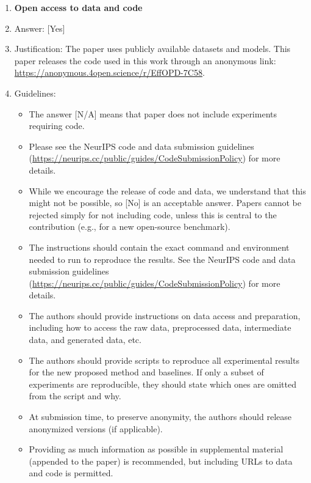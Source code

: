 \documentclass{llmxive}
\providecommand{\answerYes}[1][]{[Yes]#1}
\providecommand{\answerNo}[1][]{[No]#1}
\providecommand{\answerNA}[1][]{[N/A]#1}
\begin{document}
\begin{enumerate}
\item {\bf Open access to data and code}
    \item[] Answer: \answerYes{}
    \item[] Justification: The paper uses publicly available datasets and models. This paper releases the code used in this work through an anonymous link: \href{https://anonymous.4open.science/r/EffOPD-7C58/README.md}{https://anonymous.4open.science/r/EffOPD-7C58}.
    \item[] Guidelines:
    \begin{itemize}
        \item The answer \answerNA{} means that paper does not include experiments requiring code.
        \item Please see the NeurIPS code and data submission guidelines (\url{https://neurips.cc/public/guides/CodeSubmissionPolicy}) for more details.
        \item While we encourage the release of code and data, we understand that this might not be possible, so \answerNo{} is an acceptable answer. Papers cannot be rejected simply for not including code, unless this is central to the contribution (e.g., for a new open-source benchmark).
        \item The instructions should contain the exact command and environment needed to run to reproduce the results. See the NeurIPS code and data submission guidelines (\url{https://neurips.cc/public/guides/CodeSubmissionPolicy}) for more details.
        \item The authors should provide instructions on data access and preparation, including how to access the raw data, preprocessed data, intermediate data, and generated data, etc.
        \item The authors should provide scripts to reproduce all experimental results for the new proposed method and baselines. If only a subset of experiments are reproducible, they should state which ones are omitted from the script and why.
        \item At submission time, to preserve anonymity, the authors should release anonymized versions (if applicable).
        \item Providing as much information as possible in supplemental material (appended to the paper) is recommended, but including URLs to data and code is permitted.
    \end{itemize}


\end{enumerate}
\end{document}
